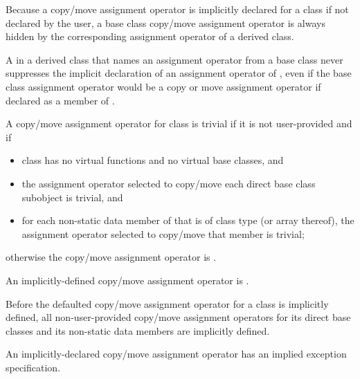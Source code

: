\pnum
{}%
%
Because a copy/move assignment operator is implicitly declared for a class
if not declared by the user,
a base class copy/move assignment operator is always hidden
by the corresponding assignment operator of a derived class.
\begin{note}
A  in a derived class 
that names an assignment operator from a base class
never suppresses the implicit declaration of
an assignment operator of ,
even if the base class assignment operator would be
a copy or move assignment operator
if declared as a member of .
\end{note}

\pnum
{}%
%
A copy/move assignment operator for class
is
trivial
if it is not user-provided and if
\begin{itemize}
\item
class
has no virtual functions
and no virtual base classes, and

\item the assignment operator selected to copy/move each direct
base class subobject is trivial, and

\item
for each non-static data member of
that is of class type (or array thereof),
the assignment operator selected to copy/move that member is trivial;
\end{itemize}
%
otherwise the copy/move assignment operator is
.

\pnum
An implicitly-defined copy/move assignment operator is .

\pnum
Before the defaulted copy/move assignment operator for a class is
implicitly defined,
all non-user-provided copy/move assignment operators for
its direct base classes and
its non-static data members are implicitly defined.
\begin{note}
An implicitly-declared copy/move assignment operator has an
implied exception specification.
\end{note}

